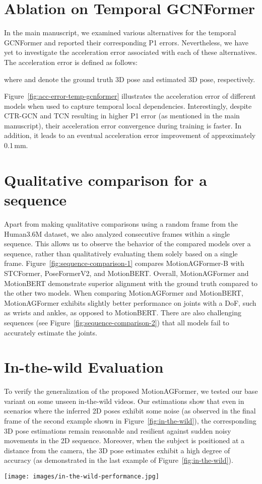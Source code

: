 \documentclass[10pt,twocolumn,letterpaper]{article}
\begin{document}
    \section{Ablation on Temporal GCNFormer}
    In the main manuscript, we examined various alternatives for the temporal GCNFormer and reported their corresponding P1 errors. Nevertheless, we have yet to investigate the acceleration error associated with each of these alternatives. The acceleration error is defined as follows:
    
    where  and  denote the ground truth 3D pose and estimated 3D pose, respectively.

    Figure~\ref{fig:acc-error-temp-gcnformer} illustrates the acceleration error of different models when used to capture temporal local dependencies. Interestingly, despite CTR-GCN and TCN resulting in higher P1 error (as mentioned in the main manuscript), their acceleration error convergence during training is faster. In addition, it leads to an eventual acceleration error improvement of approximately 0.1\,mm.
    \section{Qualitative comparison for a sequence}
    Apart from making qualitative comparisons using a random frame from the Human3.6M dataset, we also analyzed consecutive frames within a single sequence. This allows us to observe the behavior of the compared models over a sequence, rather than qualitatively evaluating them solely based on a single frame. Figure~\ref{fig:sequence-comparison-1} compares MotionAGFormer-B with STCFormer, PoseFormerV2, and MotionBERT. Overall, MotionAGFormer and MotionBERT demonstrate superior alignment with the ground truth compared to the other two models. When comparing MotionAGFormer and MotionBERT, MotionAGFormer exhibits slightly better performance on joints with a DoF, such as wrists and ankles, as opposed to MotionBERT. There are also challenging sequences (see Figure~\ref{fig:sequence-comparison-2}) that all models fail to accurately estimate the joints.
    \section{In-the-wild Evaluation}
    To verify the generalization of the proposed MotionAGFormer, we tested our base variant on some unseen in-the-wild videos. Our estimations show that even in scenarios where the inferred 2D poses exhibit some noise (as observed in the final frame of the second example shown in Figure~\ref{fig:in-the-wild}), the corresponding 3D pose estimations remain reasonable and resilient against sudden noisy movements in the 2D sequence. Moreover, when the subject is positioned at a distance from the camera, the 3D pose estimates exhibit a high degree of accuracy (as demonstrated in the last example of Figure~\ref{fig:in-the-wild}).
    
    \begin{figure*}[!t]
          \centering
          \texttt{[image: images/in-the-wild-performance.jpg]}
          \caption{In-the-wild video evaluation of MotionAGFormer. Estimations are based on our base variant.}
          \label{fig:in-the-wild}
    \end{figure*}
\end{document}
